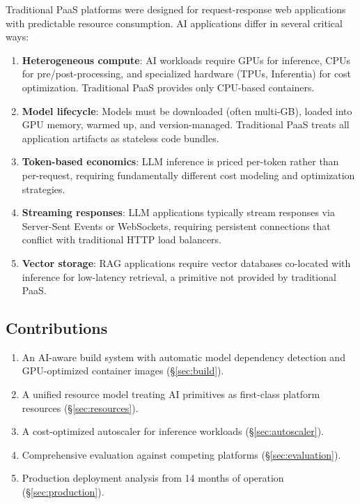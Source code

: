 \documentclass[11pt,twocolumn]{article}
\begin{document}
Traditional PaaS platforms were designed for request-response web applications with predictable resource consumption. AI applications differ in several critical ways:

\begin{enumerate}[leftmargin=1.4em]
    \item \textbf{Heterogeneous compute}: AI workloads require GPUs for inference, CPUs for pre/post-processing, and specialized hardware (TPUs, Inferentia) for cost optimization. Traditional PaaS provides only CPU-based containers.
    \item \textbf{Model lifecycle}: Models must be downloaded (often multi-GB), loaded into GPU memory, warmed up, and version-managed. Traditional PaaS treats all application artifacts as stateless code bundles.
    \item \textbf{Token-based economics}: LLM inference is priced per-token rather than per-request, requiring fundamentally different cost modeling and optimization strategies.
    \item \textbf{Streaming responses}: LLM applications typically stream responses via Server-Sent Events or WebSockets, requiring persistent connections that conflict with traditional HTTP load balancers.
    \item \textbf{Vector storage}: RAG applications require vector databases co-located with inference for low-latency retrieval, a primitive not provided by traditional PaaS.
\end{enumerate}

\subsection{Contributions}

\begin{enumerate}[leftmargin=1.4em]
    \item An AI-aware build system with automatic model dependency detection and GPU-optimized container images (\S\ref{sec:build}).
    \item A unified resource model treating AI primitives as first-class platform resources (\S\ref{sec:resources}).
    \item A cost-optimized autoscaler for inference workloads (\S\ref{sec:autoscaler}).
    \item Comprehensive evaluation against competing platforms (\S\ref{sec:evaluation}).
    \item Production deployment analysis from 14 months of operation (\S\ref{sec:production}).
\end{enumerate}
\end{document}
